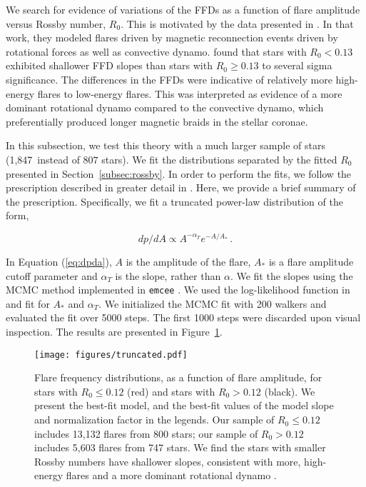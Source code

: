 \documentclass[twocolumn, linenumbers]{aastex631}
\newcommand{\nprot}{1,847}
\begin{document}
We search for evidence of variations of the FFDs as a function of flare amplitude
versus Rossby number, $R_0$. This is motivated by the data  presented in \cite{seligman22}.
In that work, they  modeled flares driven by magnetic reconnection events driven by
rotational forces as well as convective dynamo.  \cite{seligman22} found that stars
with $R_0 < 0.13$ exhibited shallower FFD slopes than stars with $R_0 \geq 0.13$ to
several sigma significance. The differences in the FFDs were indicative of relatively
more high-energy flares to low-energy flares. This was interpreted as evidence of a
more dominant rotational dynamo compared to the convective dynamo, which preferentially
produced longer magnetic braids in the stellar coronae.

In this subsection, we test this theory with a much larger sample of stars (\nprot\
instead of $807$ stars). We fit the distributions separated by the fitted $R_0$
presented in Section~\ref{subsec:rossby}. In order to perform the fits, we follow
the prescription described in greater detail in \cite{seligman22}. Here, we provide
a brief summary of the prescription. Specifically, we fit a truncated power-law
distribution of the form,

\begin{equation}\label{eq:dpda}
  dp/dA \propto A^{-\alpha_T} e^{-A/A_*}\,.
\end{equation}

In Equation (\ref{eq:dpda}),  $A$ is the amplitude of the flare, $A_*$ is a flare
amplitude cutoff parameter and $\alpha_T$ is the slope, rather than $\alpha$. We fit
the slopes using the MCMC method implemented in \texttt{emcee} \citep{goodman10, emcee}.
We used the log-likelihood function in \cite{seligman22} and  fit for $A_*$ and $\alpha_T$.
We initialized the MCMC fit with 200 walkers and evaluated the fit over 5000 steps.
The first 1000 steps were discarded upon visual inspection. The results are presented
in Figure~\ref{fig:truncated}.

\begin{figure}[ht!]
    \begin{centering}
        \texttt{[image: figures/truncated.pdf]}
        \caption{
            Flare frequency distributions, as a function of flare amplitude,
            for stars with $R_0 \leq 0.12$ (red) and stars with $R_0 > 0.12$
            (black). We present the best-fit model, and the best-fit values of
            the model slope and normalization factor in the legends. Our sample
            of $R_0 \leq 0.12$ includes 13,132 flares from 800 stars; our sample
            of $R_0 > 0.12$ includes 5,603 flares from 747 stars. We find the stars
            with smaller Rossby numbers have shallower slopes, consistent with more,
            high-energy flares and a more dominant rotational dynamo \citep{seligman22}.
        }
        \label{fig:truncated}
    \end{centering}
\end{figure}
\end{document}
